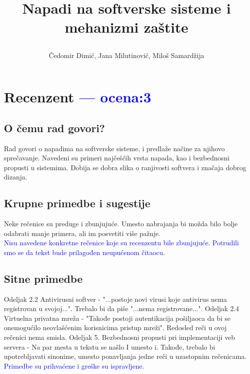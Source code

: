 \documentclass[a4paper]{report}
\newcommand{\odgovor}[1]{\textcolor{blue}{#1}}
\begin{document}
\title{Napadi na softverske sisteme i mehanizmi zaštite \small{\author{Čedomir Dimić, Jana Milutinović, Miloš Samardžija}}}

\maketitle

\tableofcontents


\chapter{Recenzent \odgovor{--- ocena:3} }


\section{O čemu rad govori?}
Rad govori o napadima na softverske sisteme, i predlaže načine za njihovo sprečavanje. Navedeni su primeri najčešćih vrsta napada, kao i bezbednosni propusti u sistemima. Dobija se dobra slika o ranjivosti softvera i značaja dobrog dizanja.

\section{Krupne primedbe i sugestije}
Neke rečenice su preduge i zbunjujuće. Umesto nabrajanja bi možda bilo bolje odabrati manje primera, ali im posvetiti više pažnje.\\
\odgovor{Nisu navedene konkretne rečenice koje su recenzentu bile zbunjujuće. Potrudili smo se da tekst bude prilagođen neupućenom čitaocu. } 

\section{Sitne primedbe}
Odeljak 2.2 Antivirusni softver - "...postoje novi virusi koje antivirus nema registrovan u svojoj...". Trebalo bi da piše "...nema registrovane...". Odeljak 2.4 Virtuelna privatna mreža - "Takođe postoji autentikacija pošiljaoca da bi se onemogućilo neovlašćenim korisnicima pristup mreži". Redosled reči u ovoj rečenici nema smisla. Odeljak 5. Bezbednosni propusti pri implementaciji veb servera - Na par mesta u tekstu se našlo I umesto i. Takođe, trebalo bi upotrebljavati sinonime, umesto ponavljanja jedne reči u uzastopnim rečenicama.\\
\odgovor{Primedbe su prihvaćene i greške su ispravljene.}
\end{document}
